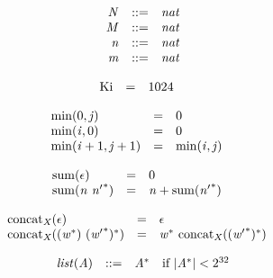 \vspace{1ex}

$$
\begin{array}{@{}lrrl@{}l@{}}
& {\mathit{N}} &::=& {\mathit{nat}} \\
& {\mathit{M}} &::=& {\mathit{nat}} \\
& {\mathit{n}} &::=& {\mathit{nat}} \\
& {\mathit{m}} &::=& {\mathit{nat}} \\
\end{array}
$$

\vspace{1ex}

$$
\begin{array}{@{}lcl@{}l@{}}
{\mathrm{Ki}} &=& 1024 &  \\
\end{array}
$$

\vspace{1ex}

$$
\begin{array}{@{}lcl@{}l@{}}
{\mathrm{min}}(0, {\mathit{j}}) &=& 0 &  \\
{\mathrm{min}}({\mathit{i}}, 0) &=& 0 &  \\
{\mathrm{min}}({\mathit{i}} + 1, {\mathit{j}} + 1) &=& {\mathrm{min}}({\mathit{i}}, {\mathit{j}}) &  \\
\end{array}
$$

$$
\begin{array}{@{}lcl@{}l@{}}
{\mathrm{sum}}(\epsilon) &=& 0 &  \\
{\mathrm{sum}}({\mathit{n}}~{{\mathit{n}'}^\ast}) &=& {\mathit{n}} + {\mathrm{sum}}({{\mathit{n}'}^\ast}) &  \\
\end{array}
$$

\vspace{1ex}

$$
\begin{array}{@{}lcl@{}l@{}}
{{\mathrm{concat}}}_{{\mathit{X}}}(\epsilon) &=& \epsilon &  \\
{{\mathrm{concat}}}_{{\mathit{X}}}(({{\mathit{w}}^\ast})~{({{\mathit{w}'}^\ast})^\ast}) &=& {{\mathit{w}}^\ast}~{{\mathrm{concat}}}_{{\mathit{X}}}({({{\mathit{w}'}^\ast})^\ast}) &  \\
\end{array}
$$

$$
\begin{array}{@{}lrrl@{}l@{}}
& {\mathit{list}}({\mathit{A}}) &::=& {{\mathit{A}}^\ast} &\quad
  \mbox{if}~{|{{\mathit{A}}^\ast}|} < {2^{32}} \\
\end{array}
$$

